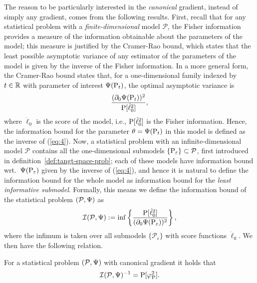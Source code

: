 \documentclass[a4,danish]{article}
\begin{document}
The reason to be particularly interested in the \textit{canonical} gradient, instead of simply any
gradient, comes from the following results. First, recall that for any statistical problem with a
\textit{finite-dimensional} model $\mathcal{P}$, the Fisher information provides a measure of the
information obtainable about the parameters of the model; this measure is justified by the
Cramer-Rao bound, which states that the least possible asymptotic variance of any estimator of the
parameters of the model is given by the inverse of the Fisher information. In a more general form,
the Cramer-Rao bound states that, for a one-dimensional family indexed by $t \in \R$ with parameter
of interest $\TT(\P_t)$, the optimal asymptotic variance is
\begin{equation}
  \label{eq:4}
  \frac{(\partial_{0}{\TT(\P_t)})^2}{\P[\dot{\ell}_0^2]},
\end{equation}
where $\dot{\ell}_0$ is the score of the model, i.e., $\P[\dot{\ell}_0^2]$ is the Fisher
information. Hence, the information bound for the parameter $\theta= \TT(\P_t)$ in this model is
defined as the inverse of (\ref{eq:4}). Now, a statistical problem with an infinite-dimensional
model $\mathcal{P}$ contains all the one-dimensional submodels
$\{\P_{\epsilon}\} \subset \mathcal{P}$, first introduced in definition~\ref{def:tangt-space-prob};
each of these models have information bound wrt.\ $\TT(\P_{\epsilon})$ given by the inverse of
(\ref{eq:4}), and hence it is natural to define the information bound for the whole model as
information bound for the \textit{least informative submodel}. Formally, this means we define the
information bound of the statistical problem $(\mathcal{P}, \TT)$ as
\begin{equation*}
  \mathcal{I}(\mathcal{P}, \TT)  := \inf
  \left\{
    \frac{\P[\dot{\ell}_0^2]}{(\partial_{0}{\TT(\P_{\epsilon})})^2}
  \right\},
\end{equation*}
where the infimum is taken over all submodels $\{\mathcal{P}_{\epsilon}\}$ with score functions
$\dot{\ell}_0$. We then have the following relation. 
\begin{proposition}
  \label{prop:cr}
  For a statistical problem $(\mathcal{P}, \TT)$ with canonical gradient  it holds that
  \begin{equation*}
    \mathcal{I}(\mathcal{P}, \TT)^{-1} = 
    \P[\phi_{\P}^2].
  \end{equation*}
\end{proposition}
\end{document}
